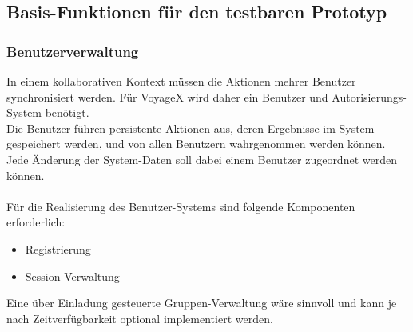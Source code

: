 \subsection{Basis-Funktionen für den testbaren Prototyp}\label{4_BASEFUNC}

\subsubsection{Benutzerverwaltung}
In einem kollaborativen Kontext müssen die Aktionen mehrer Benutzer synchronisiert werden. Für VoyageX wird daher ein Benutzer und Autorisierungs-System benötigt.\\
Die Benutzer führen persistente Aktionen aus, deren Ergebnisse im System gespeichert werden, und von allen Benutzern wahrgenommen werden können. Jede Änderung der System-Daten soll dabei einem Benutzer zugeordnet werden können.\\ \\
Für die Realisierung des Benutzer-Systems sind folgende Komponenten erforderlich:
\begin{itemize}
  \item Registrierung
  \item Session-Verwaltung
\end{itemize}
Eine über Einladung gesteuerte Gruppen-Verwaltung wäre sinnvoll und kann je nach Zeitverfügbarkeit optional
implementiert werden.

